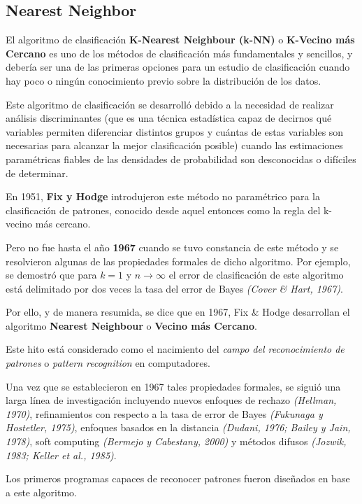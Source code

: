 \documentclass[a4paper, 11pt]{article} %
\begin{document}
\subsection{Nearest Neighbor}
El algoritmo de clasificación \textbf{K-Nearest Neighbour (k-NN)} o \textbf{K-Vecino más Cercano} es uno de los métodos de clasificación más fundamentales y sencillos, y debería ser una de las primeras opciones para un estudio de clasificación cuando hay poco o ningún conocimiento previo sobre la distribución de los datos.

Este algoritmo de clasificación se desarrolló debido a la necesidad de realizar análisis discriminantes (que es una técnica estadística capaz de decirnos qué variables permiten diferenciar distintos grupos y cuántas de estas variables son necesarias para alcanzar la mejor clasificación posible) cuando las estimaciones paramétricas fiables de las densidades de probabilidad son desconocidas o difíciles de determinar.

En 1951, \textbf{Fix y Hodge} introdujeron este método no paramétrico para la clasificación de patrones, conocido desde aquel entonces como la regla del k-vecino más cercano.

Pero no fue hasta el año \textbf{1967} cuando se tuvo constancia de este método y se resolvieron algunas de las propiedades formales de dicho algoritmo. Por ejemplo, se demostró que para $k = 1$ y $n \rightarrow \infty$ el error de clasificación de este algoritmo está delimitado por dos veces la tasa del error de Bayes \textit{(Cover \& Hart, 1967)}.

Por ello, y de manera resumida, se dice que en 1967, Fix \& Hodge desarrollan el algoritmo \textbf{Nearest Neighbour} o \textbf{Vecino más Cercano}.

Este hito está considerado como el nacimiento del \textit{campo del reconocimiento de patrones} o \textit{pattern recognition} en computadores.

Una vez que se establecieron en 1967 tales propiedades formales, se siguió una larga línea de investigación incluyendo nuevos enfoques de rechazo \textit{(Hellman, 1970)}, refinamientos con respecto a la tasa de error de Bayes \textit{(Fukunaga y Hostetler, 1975)}, enfoques basados en la distancia \textit{(Dudani, 1976; Bailey y Jain, 1978)}, soft computing \textit{(Bermejo y Cabestany, 2000)} y métodos difusos \textit{(Jozwik, 1983; Keller et al., 1985)}.

Los primeros programas capaces de reconocer patrones fueron diseñados en base a este algoritmo.
\end{document}
